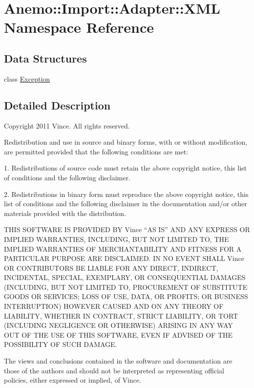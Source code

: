 \hypertarget{namespace_anemo_1_1_import_1_1_adapter_1_1_x_m_l}{
\section{Anemo::Import::Adapter::XML Namespace Reference}
\label{namespace_anemo_1_1_import_1_1_adapter_1_1_x_m_l}
}
\subsection*{Data Structures}
\begin{DoxyCompactItemize}
\item 
class \hyperlink{class_anemo_1_1_import_1_1_adapter_1_1_x_m_l_1_1_exception}{Exception}
\end{DoxyCompactItemize}


\subsection{Detailed Description}
Copyright 2011 Vince. All rights reserved.

Redistribution and use in source and binary forms, with or without modification, are permitted provided that the following conditions are met:

1. Redistributions of source code must retain the above copyright notice, this list of conditions and the following disclaimer.

2. Redistributions in binary form must reproduce the above copyright notice, this list of conditions and the following disclaimer in the documentation and/or other materials provided with the distribution.

THIS SOFTWARE IS PROVIDED BY Vince ``AS IS'' AND ANY EXPRESS OR IMPLIED WARRANTIES, INCLUDING, BUT NOT LIMITED TO, THE IMPLIED WARRANTIES OF MERCHANTABILITY AND FITNESS FOR A PARTICULAR PURPOSE ARE DISCLAIMED. IN NO EVENT SHALL Vince OR CONTRIBUTORS BE LIABLE FOR ANY DIRECT, INDIRECT, INCIDENTAL, SPECIAL, EXEMPLARY, OR CONSEQUENTIAL DAMAGES (INCLUDING, BUT NOT LIMITED TO, PROCUREMENT OF SUBSTITUTE GOODS OR SERVICES; LOSS OF USE, DATA, OR PROFITS; OR BUSINESS INTERRUPTION) HOWEVER CAUSED AND ON ANY THEORY OF LIABILITY, WHETHER IN CONTRACT, STRICT LIABILITY, OR TORT (INCLUDING NEGLIGENCE OR OTHERWISE) ARISING IN ANY WAY OUT OF THE USE OF THIS SOFTWARE, EVEN IF ADVISED OF THE POSSIBILITY OF SUCH DAMAGE.

The views and conclusions contained in the software and documentation are those of the authors and should not be interpreted as representing official policies, either expressed or implied, of Vince. 